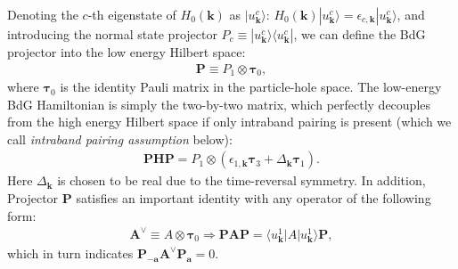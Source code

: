 \begin{subappendices}
Denoting the $c$-th eigenstate of $H_0(\bm{k})$ as $|u^c_{\bm{k}}\rangle$: $H_0(\bm{k})|u^c_{\bm{k}}\rangle=\epsilon_{c,\bm{k}}|u^c_{\bm{k}}\rangle$, and introducing the normal state projector $P_c\equiv |u^c_{\bm{k}}\rangle\langle u^c_{\bm{k}}|$, we can define the BdG projector into the low energy Hilbert space:
\begin{align}
	\mathbf P \equiv P_1\otimes \boldsymbol \tau_0,
\end{align}
where $\boldsymbol \tau_0$ is the identity Pauli matrix in the particle-hole space.
The low-energy BdG Hamiltonian is simply the two-by-two matrix, which perfectly decouples from the high energy Hilbert space if only intraband pairing is present (which we call \emph{intraband pairing assumption} below):
\begin{align}
	\mathbf P \mathbf H \mathbf P= P_1\otimes (\epsilon_{1,\bm{k}}\boldsymbol\tau_3+\varDelta_{\bm{k}}\boldsymbol\tau_1).
\end{align}
Here $\varDelta_{\bm{k}}$ is chosen to be real due to the time-reversal symmetry. In addition, Projector $\mathbf P$ satisfies an important identity with any operator of the following form:
\begin{align}
	\mathbf A^\vee\equiv A \otimes \boldsymbol\tau_0 \Rightarrow \mathbf P\mathbf A\mathbf P=\langle u^1_{\bm{k}}|A|u^1_{\bm{k}}\rangle\mathbf P,
\end{align}
which in turn indicates $\mathbf P_{-\mathbf a}\mathbf{A^\vee} \mathbf P_{\mathbf a}=0$.


\end{subappendices}
